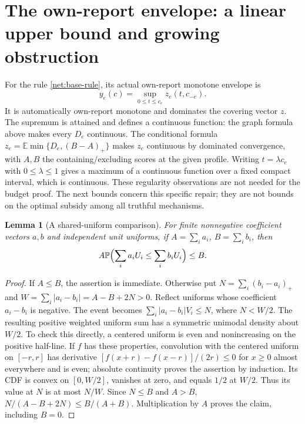 \documentclass[11pt]{article}
\newtheorem{lemma}[theorem]{Lemma}
\theoremstyle{definition}\newtheorem{definition}[theorem]{Definition}
\theoremstyle{remark}\newtheorem{remark}[theorem]{Remark}
\newcommand{\E}{\mathbb E}
\newcommand{\Prob}{\mathbb P}
\begin{document}
\section{The own-report envelope: a linear upper bound and growing obstruction}
\label{net:envelope}
For the rule \eqref{net:base-rule}, its actual own-report monotone envelope is
\[
 y_e(c)=\sup_{0\le t\le c_e}z_e(t,c_{-e}).
\]
It is automatically own-report monotone and dominates the covering vector $z$.
The supremum is attained and defines a continuous function: the graph formula
above makes every $D_e$ continuous.  The conditional formula
$z_e=\E\min\{D_e,(B-A)_+\}$ makes $z_e$ continuous by dominated
convergence, with $A,B$ the containing/excluding scores at the given profile.
Writing $t=\lambda c_e$ with $0\le\lambda\le1$ gives a maximum of a
continuous function over a fixed compact interval, which is continuous.
These regularity observations are not needed for the budget proof.
The next bounds concern this specific repair; they are not bounds on the
optimal subsidy among all truthful mechanisms.

\begin{lemma}[A shared-uniform comparison]\label{net:uniform-comparison}
For finite nonnegative coefficient vectors $a,b$ and independent unit
uniforms, if $A=\sum_i a_i$, $B=\sum_i b_i$, then
\[
 A\Prob\Bigl(\sum_i a_iU_i\le\sum_i b_iU_i\Bigr)\le B.
\]
\end{lemma}
\begin{proof}
If $A\le B$, the assertion is immediate.  Otherwise put
$N=\sum_i(b_i-a_i)_+$ and $W=\sum_i|a_i-b_i|=A-B+2N>0$.
Reflect uniforms whose coefficient $a_i-b_i$ is negative.  The event becomes
$\sum_i|a_i-b_i|V_i\le N$, where $N<W/2$.
The resulting positive weighted uniform sum has a symmetric unimodal density
about $W/2$.  To check this directly, a centered uniform is even and
nonincreasing on the positive half-line.  If $f$ has these properties,
convolution with the centered uniform on $[-r,r]$ has derivative
$[f(x+r)-f(x-r)]/(2r)\le0$ for $x\ge0$ almost everywhere and is even;
absolute continuity proves the assertion by induction.
Its CDF is convex on $[0,W/2]$, vanishes at zero, and equals $1/2$ at $W/2$.
Thus its value at $N$ is at most $N/W$.
Since $N\le B$ and $A>B$, $N/(A-B+2N)\le B/(A+B)$.
Multiplication by $A$ proves the claim, including $B=0$.
\end{proof}
\end{document}
